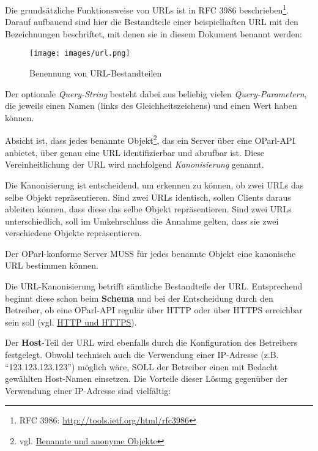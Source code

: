 \documentclass[,a4paper]{article}
\makeatletter
\def\maxwidth{\ifdim\Gin@nat@width>\linewidth\linewidth
\else\Gin@nat@width\fi}
\let\Oldincludegraphics\includegraphics
\renewcommand{\includegraphics}[1]{\Oldincludegraphics[width=\maxwidth]{#1}}
\makeatother
\begin{document}
Die grundsätzliche Funktionsweise von URLs ist in RFC 3986
beschrieben\footnote{RFC 3986: \url{http://tools.ietf.org/html/rfc3986}}.
Darauf aufbauend sind hier die Bestandteile einer beispielhaften URL mit
den Bezeichnungen beschriftet, mit denen sie in diesem Dokument benannt
werden:

\begin{figure}[htbp]
\centering
\texttt{[image: images/url.png]}
\caption{Benennung von URL-Bestandteilen}
\end{figure}

Der optionale \emph{Query-String} besteht dabei aus beliebig vielen
\emph{Query-Parametern}, die jeweils einen Namen (links des
Gleichheitszeichens) und einen Wert haben können.


Absicht ist, dass jedes benannte Objekt\footnote{vgl.
  \hyperref[benannteux5fanonymeux5fobjekte]{Benannte und anonyme
  Objekte}}, das ein Server über eine OParl-API anbietet, über genau
eine URL identifizierbar und abrufbar ist. Diese Vereinheitlichung der
URL wird nachfolgend \emph{Kanonisierung} genannt.

Die Kanonisierung ist entscheidend, um erkennen zu können, ob zwei URLs
das selbe Objekt repräsentieren. Sind zwei URLs identisch, sollen
Clients daraus ableiten können, dass diese das selbe Objekt
repräsentieren. Sind zwei URLs unterschiedlich, soll im Umkehrschluss
die Annahme gelten, dass sie zwei verschiedene Objekte repräsentieren.

Der OParl-konforme Server MUSS für jedes benannte Objekt eine kanonische
URL bestimmen können.

Die URL-Kanonisierung betrifft sämtliche Bestandteile der URL.
Entsprechend beginnt diese schon beim \textbf{Schema} und bei der
Entscheidung durch den Betreiber, ob eine OParl-API regulär über HTTP
oder über HTTPS erreichbar sein soll (vgl.
\hyperref[http-und-https]{HTTP und HTTPS}).

Der \textbf{Host}-Teil der URL wird ebenfalls durch die Konfiguration
des Betreibers festgelegt. Obwohl technisch auch die Verwendung einer
IP-Adresse (z.B. ``123.123.123.123'') möglich wäre, SOLL der Betreiber
einen mit Bedacht gewählten Host-Namen einsetzen. Die Vorteile dieser
Lösung gegenüber der Verwendung einer IP-Adresse sind vielfältig:
\end{document}

